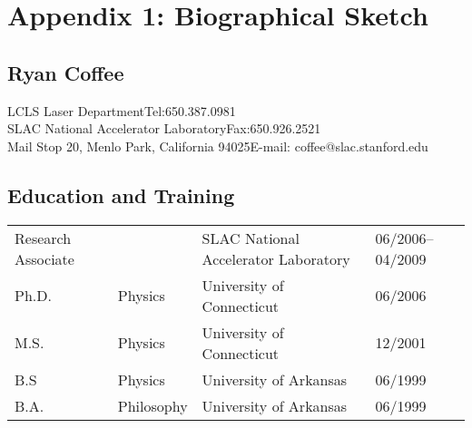 \documentclass[letterpaper,oneside,11pt]{article}
\begin{document}
\section*{Appendix 1: Biographical Sketch}
\subsection*{Ryan Coffee}
LCLS Laser Department\hfill Tel:650.387.0981\\
SLAC National Accelerator Laboratory\hfill Fax:650.926.2521\\
Mail Stop 20, Menlo Park, California  94025\hfill E-mail: coffee@slac.stanford.edu\\

\subsection*{Education and Training}
\begin{tabular}{llll}
Research Associate & & SLAC National Accelerator Laboratory & 06/2006--04/2009\\
Ph.D. & Physics & University of Connecticut & 06/2006\\
M.S. & Physics & University of Connecticut & 12/2001\\
B.S & Physics & University of Arkansas & 06/1999\\
B.A. & Philosophy & University of Arkansas & 06/1999
\end{tabular}
\end{document}
